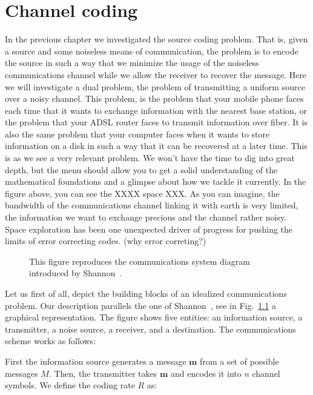 \chapter{Channel coding}
In the previous chapter we investigated the source coding problem. That is, given a source and some noiseless means of communication, the problem is to encode the source in such a way that we minimize the usage of the noiseless communications channel while we allow the receiver to recover the message. Here we will investigate a dual problem, the problem of transmitting a uniform source over a noisy channel. This problem, is the problem that your mobile phone faces each time that it wants to exchange information with the nearest base station, or the problem that your ADSL router faces to transmit information over fiber. It is also the same problem that your computer faces when it wants to store information on a disk in such a way that it can be recovered at a later time. This is as we see a very relevant problem. We won't have the time to dig into great depth, but the menu should allow you to get a solid understanding of the mathematical foundations and a glimpse about how we tackle it currently. In the figure above, you can see the XXXX space XXX. As you can imagine, the bandwidth of the communications channel linking it with earth is very limited, the information we want to exchange precious and the channel rather noisy. Space exploration has been one unexpected driver of progress for pushing the limits of error correcting codes. (why error correting?)
\begin{figure}[h!]
\begin{center}
\def\svgwidth{\columnwidth} 

\end{center}
\caption[Communications system diagram.]{This figure reproduces the communications system diagram introduced by Shannon~\cite{Shannon_48}.}
\label{fig:shannoncom}
\end{figure}
Let us first of all, depict the building blocks of an idealized communications problem. Our description parallels the one of Shannon~\cite{Shannon_48}, see in Fig.~\ref{fig:shannoncom} a graphical representation. The figure shows five entities: an information source, a transmitter, a noise source, a receiver, and a destination. The communications scheme works as follows: 

First the information source generates a message $\mathbf m$ from a set of possible messages $M$. Then, the transmitter takes $\mathbf m$ and encodes it into $n$ channel symbols. We define the coding rate $R$ as:

